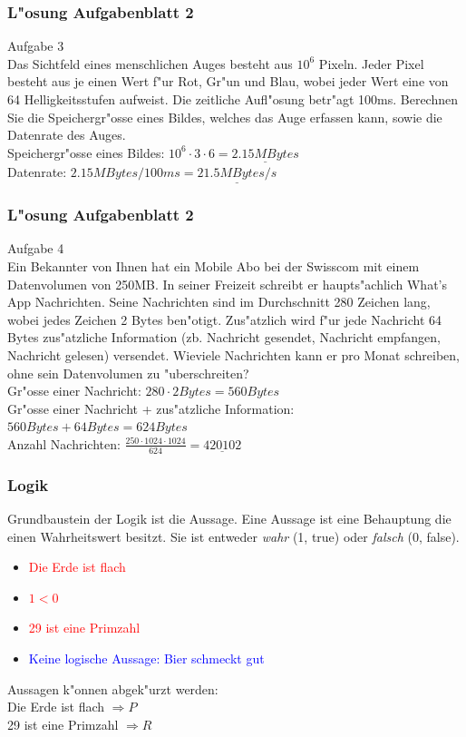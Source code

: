 \documentclass{beamer}
\begin{document}
\frame
{
	\frametitle{L"osung Aufgabenblatt 2}
	Aufgabe 3\\
	Das Sichtfeld eines menschlichen Auges besteht aus $10^6$ Pixeln.
	Jeder Pixel besteht aus je einen Wert f"ur Rot, Gr"un und Blau,
	wobei jeder Wert eine von 64 Helligkeitsstufen aufweist. Die zeitliche
	Aufl"osung betr"agt 100ms. Berechnen Sie die Speichergr"osse eines Bildes,
	welches das Auge erfassen kann, sowie die Datenrate des Auges.\\
	\vspace{4mm}
	Speichergr"osse eines Bildes: $10^6 \cdot 3 \cdot 6 = \underline{2.15 MBytes}$\\
	Datenrate: $2.15 MBytes / 100 ms = \underline{21.5 MBytes / s}$
}

\frame
{
	\frametitle{L"osung Aufgabenblatt 2}
	Aufgabe 4\\
	{\small
	Ein Bekannter von Ihnen hat ein Mobile Abo bei der Swisscom mit einem Datenvolumen von
250MB. In seiner Freizeit schreibt er haupts"achlich What's App Nachrichten. Seine 
Nachrichten sind im Durchschnitt 280 Zeichen lang, wobei jedes Zeichen 2 Bytes ben"otigt. Zus"atzlich wird f"ur jede Nachricht 64 Bytes zus"atzliche
Information (zb. Nachricht gesendet, Nachricht empfangen, Nachricht gelesen)
versendet.
Wieviele Nachrichten kann er pro Monat schreiben, ohne sein Datenvolumen zu "uberschreiten?\\
	}
	\vspace{4mm}
	Gr"osse einer Nachricht: $280 \cdot 2 Bytes = 560 Bytes$\\
	Gr"osse einer Nachricht + zus"atzliche Information: $560 Bytes + 64 Bytes = 624 Bytes$\\
	Anzahl Nachrichten: $\frac{250 \cdot 1024 \cdot 1024}{624} = \underline{420102}$
}

\frame
{
	\frametitle{Logik}
	Grundbaustein der Logik ist die Aussage. Eine Aussage ist eine Behauptung die einen
	Wahrheitswert besitzt. Sie ist entweder \emph{wahr} (1, true) oder \emph{falsch} (0, false).
	\begin{itemize}
	\item \textcolor{red}{Die Erde ist flach} 
	\item \textcolor{red}{$1 < 0$}
	\item \textcolor{red}{29 ist eine Primzahl}
    \item \textcolor{blue}{Keine logische Aussage: Bier schmeckt gut}
	\end{itemize}
	\vspace{3mm}
	Aussagen k"onnen abgek"urzt werden:\\
	Die Erde ist flach $\Rightarrow P$\\
	29 ist eine Primzahl $\Rightarrow R$
}
\end{document}
